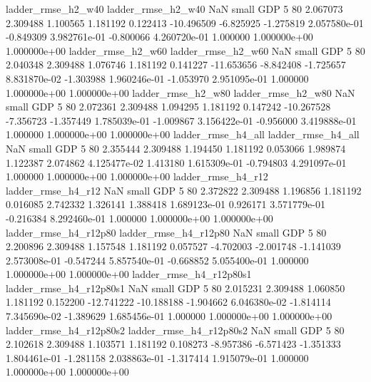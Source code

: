       ladder_rmse_h2_w40       ladder_rmse_h2_w40                   NaN      small      GDP                 5 80 2.067073       2.309488 1.100565       1.181192    0.122413    -10.496509     -6.825925    -1.275819   2.057580e-01 -0.849309 3.982761e-01    -0.800066   4.260720e-01            1.000000    1.000000e+00        1.000000e+00
      ladder_rmse_h2_w60       ladder_rmse_h2_w60                   NaN      small      GDP                 5 80 2.040348       2.309488 1.076746       1.181192    0.141227    -11.653656     -8.842408    -1.725657   8.831870e-02 -1.303988 1.960246e-01    -1.053970   2.951095e-01            1.000000    1.000000e+00        1.000000e+00
      ladder_rmse_h2_w80       ladder_rmse_h2_w80                   NaN      small      GDP                 5 80 2.072361       2.309488 1.094295       1.181192    0.147242    -10.267528     -7.356723    -1.357449   1.785039e-01 -1.009867 3.156422e-01    -0.956000   3.419888e-01            1.000000    1.000000e+00        1.000000e+00
      ladder_rmse_h4_all       ladder_rmse_h4_all                   NaN      small      GDP                 5 80 2.355444       2.309488 1.194450       1.181192    0.053066      1.989874      1.122387     2.074862   4.125477e-02  1.413180 1.615309e-01    -0.794803   4.291097e-01            1.000000    1.000000e+00        1.000000e+00
      ladder_rmse_h4_r12       ladder_rmse_h4_r12                   NaN      small      GDP                 5 80 2.372822       2.309488 1.196856       1.181192    0.016085      2.742332      1.326141     1.388418   1.689123e-01  0.926171 3.571779e-01    -0.216384   8.292460e-01            1.000000    1.000000e+00        1.000000e+00
   ladder_rmse_h4_r12p80    ladder_rmse_h4_r12p80                   NaN      small      GDP                 5 80 2.200896       2.309488 1.157548       1.181192    0.057527     -4.702003     -2.001748    -1.141039   2.573008e-01 -0.547244 5.857540e-01    -0.668852   5.055400e-01            1.000000    1.000000e+00        1.000000e+00
 ladder_rmse_h4_r12p80s1  ladder_rmse_h4_r12p80s1                   NaN      small      GDP                 5 80 2.015231       2.309488 1.060850       1.181192    0.152200    -12.741222    -10.188188    -1.904662   6.046380e-02 -1.814114 7.345690e-02    -1.389629   1.685456e-01            1.000000    1.000000e+00        1.000000e+00
 ladder_rmse_h4_r12p80s2  ladder_rmse_h4_r12p80s2                   NaN      small      GDP                 5 80 2.102618       2.309488 1.103571       1.181192    0.108273     -8.957386     -6.571423    -1.351333   1.804461e-01 -1.281158 2.038863e-01    -1.317414   1.915079e-01            1.000000    1.000000e+00        1.000000e+00
